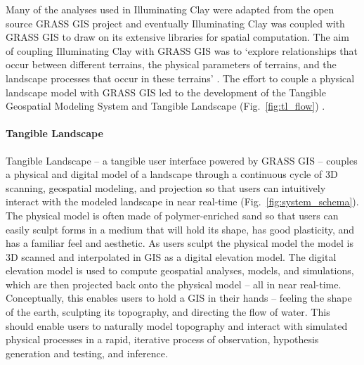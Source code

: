 \documentclass{isprs}
\begin{document}
Many of the analyses used in Illuminating Clay were adapted from the open source GRASS GIS project \cite{Piper2002a} 
and eventually 
Illuminating Clay was coupled with GRASS GIS 
to draw on its extensive libraries for spatial computation. 
The aim of coupling Illuminating Clay with GRASS GIS was to 
`explore relationships that occur between different terrains, the physical parameters of terrains, and the landscape processes that occur in these terrains' \cite{Mitasova2006}. 
%
The effort to couple a physical landscape model with GRASS GIS led to the development of 
the Tangible Geospatial Modeling System \cite{Tateosian2010} and Tangible Landscape (Fig.~\ref{fig:tl_flow}) \cite{Petrasova2014,Petrasova2015}.


\paragraph{Tangible Landscape}
Tangible Landscape -- a tangible user interface powered by GRASS GIS --
couples a physical and digital model of a landscape through a continuous cycle of 3D scanning, geospatial modeling, and projection
so that users can intuitively interact with the modeled landscape in near real-time 
(Fig.~\ref{fig:system_schema}). 
%
The physical model is often made of polymer-enriched sand so that users can easily sculpt forms in a medium that will hold its shape, has good plasticity, and has a familiar feel and aesthetic. 
% 
As users sculpt the physical model
the model is 3D scanned and
interpolated in GIS as a digital elevation model. 
The digital elevation model is used to compute 
geospatial analyses, models, and simulations, 
which are then projected back onto the physical model 
-- all in near real-time.
%
Conceptually, this enables users to hold a GIS in their hands -- 
feeling the shape of the earth, sculpting its topography, and directing the flow of water.
%
This should enable users to naturally model topography and interact with simulated physical processes in a rapid, iterative process 
of observation, hypothesis generation and testing, and inference. 
\end{document}
